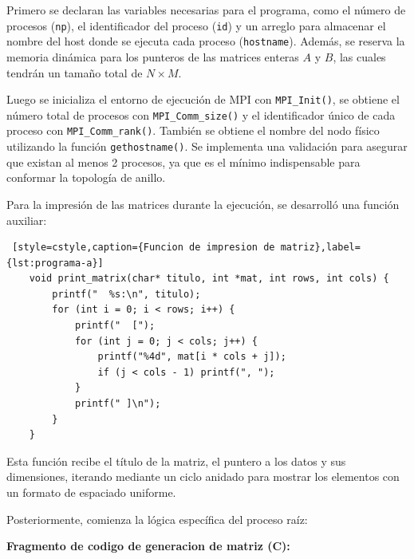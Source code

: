 \documentclass[letterpaper,11pt]{article}
\begin{document}
    Primero se declaran las variables necesarias para el programa, como el número de procesos (\texttt{np}), el identificador del proceso (\texttt{id}) y un arreglo para almacenar el nombre del host donde se ejecuta cada proceso (\texttt{hostname}). Además, se reserva la memoria dinámica para los punteros de las matrices enteras $A$ y $B$, las cuales tendrán un tamaño total de $N \times M$.
    
    Luego se inicializa el entorno de ejecución de MPI con \texttt{MPI\_Init()}, se obtiene el número total de procesos con \texttt{MPI\_Comm\_size()} y el identificador único de cada proceso con \texttt{MPI\_Comm\_rank()}. También se obtiene el nombre del nodo físico utilizando la función \texttt{gethostname()}. Se implementa una validación para asegurar que existan al menos 2 procesos, ya que es el mínimo indispensable para conformar la topología de anillo.

    Para la impresión de las matrices durante la ejecución, se desarrolló una función auxiliar:
    
    \begin{lstlisting} [style=cstyle,caption={Funcion de impresion de matriz},label={lst:programa-a}]
    void print_matrix(char* titulo, int *mat, int rows, int cols) {
        printf("  %s:\n", titulo);
        for (int i = 0; i < rows; i++) {
            printf("  [");
            for (int j = 0; j < cols; j++) {
                printf("%4d", mat[i * cols + j]);
                if (j < cols - 1) printf(", ");
            }
            printf(" ]\n");
        }
    }
    \end{lstlisting}

    Esta función recibe el título de la matriz, el puntero a los datos y sus dimensiones, iterando mediante un ciclo anidado para mostrar los elementos con un formato de espaciado uniforme.

    Posteriormente, comienza la lógica específica del proceso raíz:
    
    \textbf{Fragmento de codigo de generacion de matriz (C):}
\end{document}

